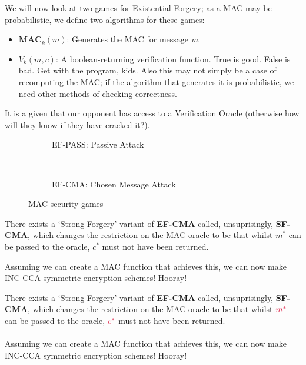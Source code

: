     We will now look at two games for Existential Forgery; as a MAC may be probabilistic, we define two algorithms for these games:

    \begin{itemize}
        \item $\textbf{MAC}_{k}(m)$: Generates the MAC for message \emph{m}.
        \item $V_{k}(m, c)$: A boolean-returning verification function. True is good. False is bad. Get with the program, kids. Also this may not simply be a case of recomputing the MAC; if the algorithm that generates it is probabilistic, we need other methods of checking correctness.
    \end{itemize}

    It is a given that our opponent has access to a Verification Oracle (otherwise how will they know if they have cracked it?). 

    \begin{figure}[htp!]
    \centering
    \begin{subfigure}[b]{0.4\textwidth}
        \centering
        \begin{cryptogame}{}
            \cgameleft{$\cmast$, $\ccast$}
        \end{cryptogame}
        \caption{EF-PASS: Passive Attack}
        \label{fig:ef-pass}
    \end{subfigure}
    ~
    \begin{subfigure}[b]{0.4\textwidth}
        \centering
        \begin{cryptogame}{}
            \cgameleft{$\cmast$, $\ccast$}
        \end{cryptogame}
        \caption{EF-CMA: Chosen Message Attack}
        \label{fig:ef-cma}
    \end{subfigure}
    \caption{MAC security games}
    \label{fig:ef-games}
\end{figure}

    There exists a `Strong Forgery' variant of \textbf{EF-CMA} called, unsuprisingly, \textbf{SF-CMA}, which changes the restriction on the MAC oracle to be that whilst $m^{*}$ can be passed to the oracle, $c^{*}$ must not have been returned.

    Assuming we can create a MAC function that achieves this, we can now make INC-CCA symmetric encryption schemes! Hooray!

    There exists a `Strong Forgery' variant of \textbf{EF-CMA} called, unsuprisingly, \textbf{SF-CMA}, which changes the restriction on the MAC oracle to be that whilst $\cmast$ can be passed to the oracle, $\ccast$ must not have been returned.\\
    \\
    Assuming we can create a MAC function that achieves this, we can now make INC-CCA symmetric encryption schemes! Hooray!\\
    \\

